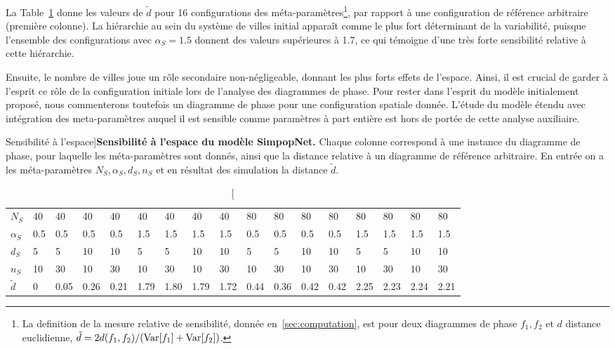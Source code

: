 La Table~\ref{tab:macrocoevolexplo:spacematters} donne les valeurs de $\tilde{d}$ pour 16 configurations des méta-paramètres\footnote{La definition de la mesure relative de sensibilité, donnée en~\ref{sec:computation}, est pour deux diagrammes de phase $f_1,f_2$ et $d$ distance euclidienne, $\tilde{d} = 2 d(f_1,f_2)/(\operatorname{Var}\!\left[f_1\right]+\operatorname{Var}\!\left[f_2\right])$.}, par rapport à une configuration de référence arbitraire (première colonne). La hiérarchie au sein du système de villes initial apparaît comme le plus fort déterminant de la variabilité, puisque l'ensemble des configurations avec $\alpha_S = 1.5$ donnent des valeurs supérieures à 1.7, ce qui témoigne d'une très forte sensibilité relative à cette hiérarchie.

Ensuite, le nombre de villes joue un rôle secondaire non-négligeable, donnant les plus forts effets de l'espace. Ainsi, il est crucial de garder à l'esprit ce rôle de la configuration initiale lors de l'analyse des diagrammes de phase. Pour rester dans l'esprit du modèle initialement proposé, nous commenterons toutefois un diagramme de phase pour une configuration spatiale donnée. L'étude du modèle étendu avec intégration des meta-paramètres auquel il est sensible comme paramètres à part entière est hors de portée de cette analyse auxiliaire.


\begin{table}[!ht]
\caption[Sensibility to space][Sensibilité à l'espace]{}{\textbf{Sensibilité à l'espace du modèle SimpopNet.} Chaque colonne correspond à une instance du diagramme de phase, pour laquelle les méta-paramètres sont donnés, ainsi que la distance relative à un diagramme de référence arbitraire. En entrée on a les méta-paramètres $N_S,\alpha_S,d_S,n_S$ et en résultat des simulation la distance $\tilde{d}$.\label{tab:macrocoevolexplo:spacematters}}
\begin{tabular}{|l|l|l|l|l|l|l|l|l|l|l|l|l|l|l|l|l|}
\hline
$N_S$ & 40 & 40 & 40 & 40 & 40 & 40 & 40 & 40 & 80 & 80 & 80 & 80 & 80 & 80 & 80 & 80\\
$\alpha_S$ & 0.5 & 0.5 & 0.5 & 0.5 & 1.5 & 1.5 & 1.5 & 1.5 & 0.5 & 0.5 & 0.5 & 0.5 & 1.5 & 1.5 & 1.5 & 1.5\\
$d_S$ & 5 & 5 & 10 & 10 & 5 & 5 & 10 & 10 & 5 & 5 & 10 & 10 & 5 & 5 & 10 & 10\\
$n_S$ & 10 & 30 & 10 & 30 & 10 & 30 & 10 & 30 & 10 & 30 & 10 & 30 & 10 & 30 & 10 & 30\\\hline
$\tilde{d}$ & 0 & 0.05 & 0.26 & 0.21 & 1.79 & 1.80 & 1.79 & 1.72 & 0.44 & 0.36 & 0.42 & 0.42 & 2.25 & 2.23 & 2.24 & 2.21\\\hline
\end{tabular}
\end{table}



